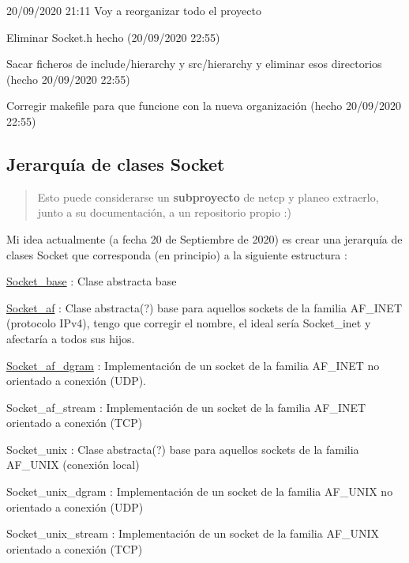\begin{DoxyItemize}
\item 20/09/2020 21\+:11 Voy a reorganizar todo el proyecto
\begin{DoxyItemize}
\item Eliminar Socket.\+h hecho (20/09/2020 22\+:55)
\item Sacar ficheros de include/hierarchy y src/hierarchy y eliminar esos directorios (hecho 20/09/2020 22\+:55)
\item Corregir makefile para que funcione con la nueva organización (hecho 20/09/2020 22\+:55)
\end{DoxyItemize}
\end{DoxyItemize}

\subsection*{Jerarquía de clases Socket}

\begin{quote}
Esto puede considerarse un {\bfseries subproyecto} de {\ttfamily netcp} y planeo extraerlo, junto a su documentación, a un repositorio propio \+:)~\newline
~\newline
 \end{quote}
Mi idea actualmente (a fecha 20 de Septiembre de 2020) es crear una jerarquía de clases Socket que corresponda (en principio) a la siguiente estructura \+:


\begin{DoxyItemize}
\item \hyperlink{classSocket__base}{Socket\+\_\+base} \+: Clase abstracta base
\begin{DoxyItemize}
\item \hyperlink{classSocket__af}{Socket\+\_\+af} \+: Clase abstracta(?) base para aquellos sockets de la familia A\+F\+\_\+\+I\+N\+ET (protocolo I\+Pv4), tengo que corregir el nombre, el ideal sería {\ttfamily Socket\+\_\+inet} y afectaría a todos sus hijos.
\begin{DoxyItemize}
\item \hyperlink{classSocket__af__dgram}{Socket\+\_\+af\+\_\+dgram} \+: Implementación de un socket de la familia A\+F\+\_\+\+I\+N\+ET no orientado a conexión (U\+DP).
\item Socket\+\_\+af\+\_\+stream \+: Implementación de un socket de la familia A\+F\+\_\+\+I\+N\+ET orientado a conexión (T\+CP)
\end{DoxyItemize}
\item Socket\+\_\+unix \+: Clase abstracta(?) base para aquellos sockets de la familia A\+F\+\_\+\+U\+N\+IX (conexión local)
\begin{DoxyItemize}
\item Socket\+\_\+unix\+\_\+dgram \+: Implementación de un socket de la familia A\+F\+\_\+\+U\+N\+IX no orientado a conexión (U\+DP)
\item Socket\+\_\+unix\+\_\+stream \+: Implementación de un socket de la familia A\+F\+\_\+\+U\+N\+IX orientado a conexión (T\+CP) 
\end{DoxyItemize}
\end{DoxyItemize}
\end{DoxyItemize}
